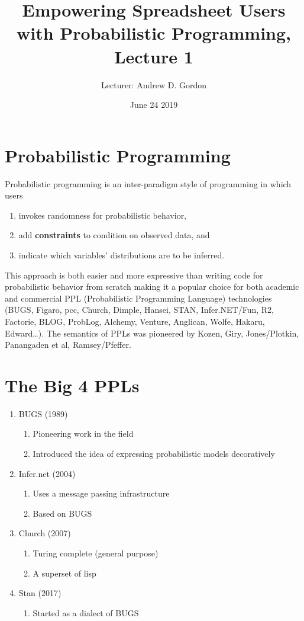 \documentclass{article}
\title{Empowering Spreadsheet Users with Probabilistic Programming, Lecture 1}
\author{Lecturer: Andrew D. Gordon}
\date{June 24 2019}
\begin{document}
\maketitle

\section{Probabilistic Programming}
\sno{}
Probabilistic programming is an inter-paradigm style of programming in which users
\begin{enumerate}
\item invokes randomness for probabilistic behavior,
\item add {\bf constraints} to condition on observed data, and
\item indicate which variables' distributions are to be inferred.
\end{enumerate}

\sno{}
This approach is both easier and more expressive than writing code for probabilistic behavior from scratch making it a popular choice for both academic and commercial \gls{PPL} (Probabilistic Programming Language) technologies (BUGS, Figaro, pcc, Church, Dimple, Hansei, STAN, Infer.NET/Fun, R2, Factorie, BLOG, ProbLog, Alchemy, Venture, Anglican, Wolfe, Hakaru, Edward…). The semantics of PPLs was pioneered by Kozen, Giry, Jones/Plotkin, Panangaden et al, Ramsey/Pfeffer.



\section{The Big 4 PPLs}
\begin{enumerate}[label=\Roman*]
    \item BUGS (1989)
    \begin{enumerate}[label=\roman*]
        \item Pioneering work in the field
        \item Introduced the idea of expressing probabilistic models decoratively
    \end{enumerate}
    \item Infer.net (2004) \cite{Minka:18:InferNET}
    \begin{enumerate}[label=\roman*]
        \item Uses a message passing infrastructure
        \item Based on BUGS
    \end{enumerate}
    \item Church (2007)
    \begin{enumerate}[label=\roman*]
        \item Turing complete (general purpose)
        \item A superset of lisp
    \end{enumerate}
    \item Stan (2017)
    \begin{enumerate}[label=\roman*]
        \item Started as a dialect of BUGS
    \end{enumerate}
\end{enumerate}
\end{document}

